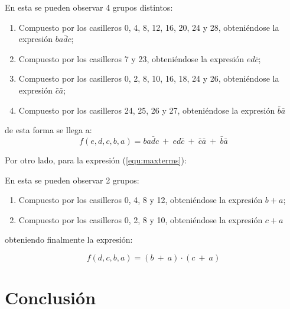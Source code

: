 \documentclass[a4paper]{article}
\begin{document}


En esta se pueden observar 4 grupos distintos:
\begin{enumerate}
	\item Compuesto por los casilleros 0, 4, 8, 12, 16, 20, 24 y 28, obteniéndose la expresión $ b a \bar{d} c $;
	\item Compuesto por los casilleros 7 y 23, obteniéndose la expresión $ e d \bar{c} $;
	\item Compuesto por los casilleros 0, 2, 8, 10, 16, 18, 24 y 26, obteniéndose la expresión $ \bar{c} \bar{a} $;
	\item Compuesto por los casilleros 24, 25, 26 y 27, obteniéndose la expresión $ \bar{b} \bar{a} $
\end{enumerate}

de esta forma se llega a:
\begin{equation}
	f \left( e,d,c,b,a \right) = b a \bar{d} c \ + \  e d \bar{c} \ + \ \bar{c} \bar{a} \ + \ \bar{b} \bar{a}
\end{equation}



Por otro lado, para la expresión (\ref{equ:maxterms}):



En esta se pueden observar 2 grupos:
\begin{enumerate}
	\item Compuesto por los casilleros 0, 4, 8 y 12, obteniéndose la expresión $ b + a $;
	\item Compuesto por los casilleros 0, 2, 8 y 10, obteniéndose la expresión $ c + a $
\end{enumerate}

obteniendo finalmente la expresión: 

\begin{equation}
	f \left( d,c,b,a \right) = \left( b \ + \ a \right) \cdot \left( c \ + \ a \right)
\end{equation}

\section*{Conclusión}
\end{document}
